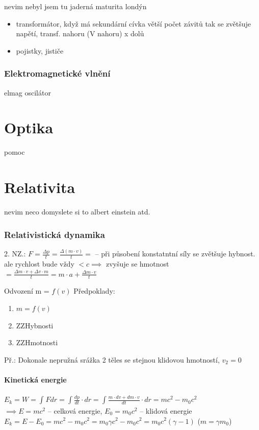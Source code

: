 \documentclass{article}
\begin{document}
nevim nebyl jsem tu jaderná maturita londýn

\begin{itemize}
  \item transformátor, když má sekundární cívka větší počet závitů tak se zvětšuje napětí, transf. nahoru (V nahoru) x dolů
  \item pojistky, jističe
\end{itemize}

\section{Elektromagnetické vlnění}
elmag oscilátor

\part{Optika}
pomoc

\part{Relativita}
nevim neco domyslete si to albert einstein atd.

\section{Relativistická dynamika}

2. NZ.: $F = \frac{\Delta p}{t} = \frac{\Delta \left( m \cdot v \right)}{t} = $ -- při působení konstatntní síly se zvětšuje hybnost. ale rychlost bude vždy $<c \implies$ zvyšuje se hmotnost
$= \frac{\Delta m \cdot v + \Delta v \cdot m}{t} = m \cdot a + \frac{\Delta m \cdot v}{t}$

Odvození m = $f\left(v\right)$
Předpoklady: \begin{enumerate}[1.]
  \item $m = f\left(v\right)$
  \item ZZHybnosti
  \item ZZHmotnosti
\end{enumerate}

Př.: Dokonale nepružná srážka 2 těles se stejnou klidovou hmotností, $v_2 = 0$

\subsection{Kinetická energie}

$E_k = W = \int_{}^{} F dr = \int \frac{dp}{dt} \cdot dr = \int \frac{m \cdot dv + dm \cdot v}{dt} \cdot dr = mc^2 - m_0 c^2$\\
$\implies E = mc^2$ -- celková energie, $E_0 = m_0 c^2$ -- klidová energie\\
$E_k = E - E_0 = mc^2 - m_0 c^2 = m_0 \gamma c^2 - m_0 c^2 = m_0 c^2 (\gamma - 1)$ ($m = \gamma m_0$)\\
\end{document}
